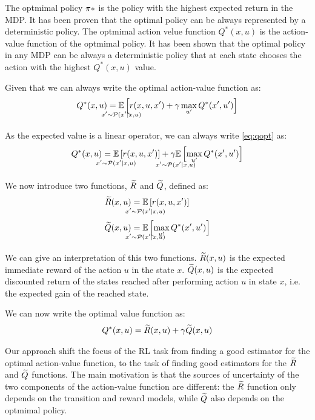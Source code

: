 \documentclass[conference]{IEEEtran}
\begin{document}
The optmimal policy $\pi*$ is the policy with the highest expected return in the MDP. It has been proven that the optimal policy can be always represented by a deterministic policy. The optmimal action velue function $Q^*(x, u)$ is the action-value function of the optmimal policy.
It has been shown that the optimal policy in any MDP can be always a deterministic policy that at each state chooses the action with the highest $Q^*(x, u)$ value.

Given that we can always write the optimal action-value function as:
\begin{align}
 Q^*(x,u)=\underset{\strut\mathclap{x'\sim \Pmodel(x'|x,u)}}{\mathbb{E}}\left[ r(x,u,x')+\gamma\max_{u'} Q^*(x',u')\right]
 \label{eq:qopt}
\end{align}

As the expected value is a linear operator, we can always write \ref{eq:qopt} as:
\begin{align}
 Q^*(x,u)=\underset{\strut\mathclap{x'\sim \Pmodel(x'|x,u)}}{\mathbb{E}}\left[ r(x,u,x')\right]+\underset{\strut\mathclap{x'\sim \Pmodel(x'|x,u)}}{\gamma\mathbb{E}}\left[ \max_{u'} Q^*(x',u')\right]
 \label{eq:qdec}
\end{align}

We now introduce two functions, $\widetilde{R}$ and $\widetilde{Q}$, defined as:
\begin{align}
 \Rtilde(x,u)&=\underset{\strut\mathclap{x'\sim \Pmodel(x'|x,u)}}{\mathbb{E}}\left[ r(x,u,x')\right] \nonumber\ \\
 \Qtilde(x,u)&=\underset{\strut\mathclap{x'\sim \Pmodel(x'|x,u)}}{\mathbb{E}}\left[\max_{u'} Q^*(x',u')\right]
 \label{eq:rqtilde}
\end{align}

We can give an interpretation of this two functions. $\widetilde{R}(x,u)$ is the expected immediate reward of the action $u$ in the state $x$. $\widetilde{Q}(x,u)$ is the expected discounted return of the states reached after performing action $u$ in state $x$, i.e. the expected gain of the reached state.

We can now write the optimal value function as:
\begin{align}
 Q^*(x,u)=\Rtilde(x,u)+\gamma\Qtilde(x,u)
 \label{eq:qdecrqtilde}
\end{align}

Our approach shift the focus of the RL task from finding a good estimator for the optimal action-value function, to the task of finding good estimators for the $\widetilde{R}$ and $\widetilde{Q}$ functions. The main motivation is that the sources of uncertainty of the two components of the action-value function are different: the $\widetilde{R}$ function only depends on the transition and reward models, while $\widetilde{Q}$ also depends on the optmimal policy.
\end{document}

